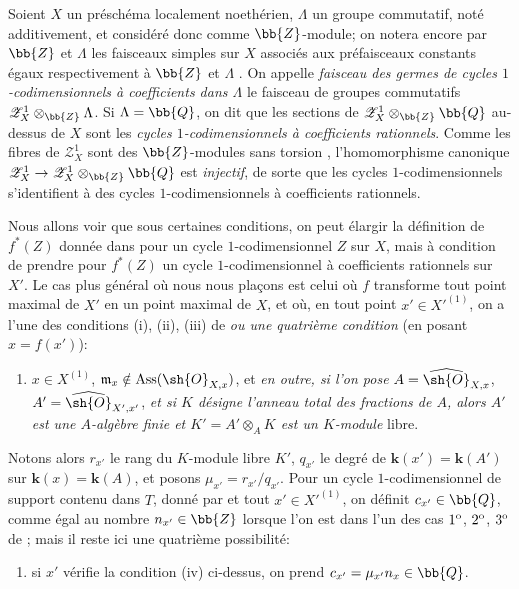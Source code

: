 \begin{env}[21.10.9]
\label{IV.21.10.9}
Soient $X$ un préschéma localement noethérien, $\Lambda$ un groupe commutatif, noté additivement, et considéré donc comme $\bb{Z}$-module;
on notera encore par $\bb{Z}$ et $\Lambda$ les faisceaux simples sur $X$ associés aux préfaisceaux constants égaux respectivement à $\bb{Z}$ et $\Lambda$ .
On appelle \emph{faisceau des germes de cycles $1$-codimensionnels à coefficients dans $\Lambda$} le faisceau de groupes commutatifs $\mathscr{Z}^1_X\otimes_{\bb{Z}}\Lambda$.
Si $\Lambda=\bb{Q}$, on dit que les sections
de $\mathscr{Z}^1_X\otimes_{\bb{Z}}\bb{Q}$ au-dessus de $X$ sont les \emph{cycles $1$-codimensionnels à coefficients rationnels}.
Comme les fibres de $\mathscr{Z}^1_X$ sont des $\bb{Z}$-modules sans torsion , l'homomorphisme canonique $\mathscr{Z}^1_X\to\mathscr{Z}^1_X\otimes_{\bb{Z}}\bb{Q}$ est \emph{injectif}, de sorte que les cycles $1$-codimensionnels s'identifient à des cycles $1$-codimensionnels à coefficients rationnels.
\end{env}

\begin{env}[21.10.10]
\label{IV.21.10.10}
Nous allons voir que sous certaines conditions, on peut élargir la définition de $f^*(Z)$ donnée dans  pour un cycle $1$-codimensionnel $Z$ sur $X$, mais à condition de prendre pour $f^*(Z)$ un cycle $1$-codimensionnel à coefficients rationnels sur $X'$.
Le cas plus général où nous nous plaçons est celui où $f$ transforme tout point maximal de $X'$ en un point maximal de $X$, et où, en tout point $x'\in X'^{(1)}$, on a l'une des conditions (i), (ii), (iii) de  \emph{ou une quatrième condition} (en posant $x=f(x')$):
\begin{enumerate}
  \item[(iv)] $x\in X^{(1)}$, $\mathfrak{m}_x\notin\operatorname{Ass}(\sh{O}_{X,x})$, et \emph{en outre, si l'on pose} $A=\widehat{\sh{O}}_{X,x}$, $A'=\widehat{\sh{O}}_{X',x'}$, \emph{et si $K$ désigne l'anneau total des fractions de $A$, alors $A'$ est une $A$-algèbre finie et $K'=A'\otimes_AK$ est un $K$-module} libre.
\end{enumerate}

Notons alors $r_{x'}$ le rang du $K$-module libre $K'$, $q_{x'}$ le degré de $\boldsymbol{k}(x')=\boldsymbol{k}(A')$ sur $\boldsymbol{k}(x)=\boldsymbol{k}(A)$, et posons $\mu_{x'}=r_{x'}/q_{x'}$.
Pour un cycle $1$-codimensionnel de support contenu dans $T$, donné par  et tout $x'\in X'^{(1)}$, on définit $c_{x'}\in\bb{Q}$, comme égal au nombre $n_{x'}\in\bb{Z}$ lorsque l'on est dans l'un des cas $1\textsuperscript{o}$, $2\textsuperscript{o}$, $3\textsuperscript{o}$ de ; mais il reste ici une quatrième possibilité:
\begin{enumerate}
  \item[$4\textsuperscript{o}$] si $x'$ vérifie la condition (iv) ci-dessus, on prend $c_{x'}=\mu_{x'}n_x\in\bb{Q}$.
\end{enumerate}
\end{env}


